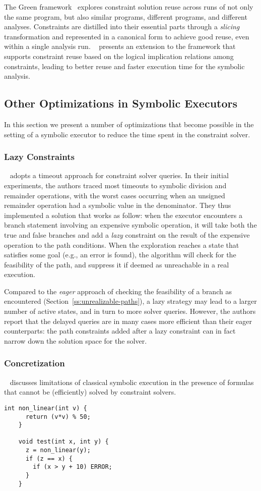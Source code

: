 The Green framework~\cite{GREEN-FSE12} explores constraint solution reuse across runs of not only the same program, but also similar programs, different programs, and different analyses. Constraints are distilled into their essential parts through a {\em slicing} transformation and represented in a canonical form to achieve good reuse, even within a single analysis run. ~\cite{JGY-ISSTA15} presents an extension to the framework that supports constraint reuse based on the logical implication relations among constraints, leading to better reuse and faster execution time for the symbolic analysis.

\subsection{Other Optimizations in Symbolic Executors}
In this section we present a number of optimizations that become possible in the setting of a symbolic executor to reduce the time spent in the constraint solver.

\subsubsection{Lazy Constraints}
~\cite{UCKLEE-USEC15} adopts a timeout approach for constraint solver queries. In their initial experiments, the authors traced most timeouts to symbolic division and remainder operations, with the worst cases occurring when an unsigned remainder operation had a symbolic value in the denominator.
They thus implemented a solution that works as follow: when the executor encounters a branch statement involving an expensive symbolic operation, it will take both the true and false branches and add a {\em lazy} constraint on the result of the expensive operation to the path conditions. When the exploration reaches a state that satisfies some goal (e.g., an error is found), the algorithm will check for the feasibility of the path, and suppress it if deemed as unreachable in a real execution.

Compared to the {\em eager} approach of checking the feasibility of a branch as encountered (Section~\ref{ss:unrealizable-paths}), a lazy strategy may lead to a larger number of active states, and in turn to more solver queries. However, the authors report that the delayed queries are in many cases more efficient than their eager counterparts: the path constraints added after a lazy constraint can in fact narrow down the solution space for the solver.

\subsubsection{Concretization}
~\cite{CS-CACM13} discusses limitations of classical symbolic execution in the presence of formulas that cannot be (efficiently) solved by constraint solvers.
    \begin{lstlisting}[basicstyle=\ttfamily\small]
    int non_linear(int v) {
      return (v*v) % 50;
    }
    
    void test(int x, int y) {
      z = non_linear(y);
      if (z == x) {
        if (x > y + 10) ERROR;  
      }
    }
    \end{lstlisting}

